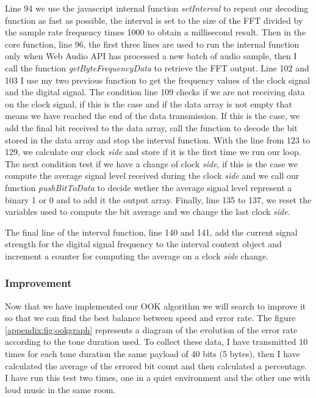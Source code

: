 \documentclass[twocolumn,14pt]{extarticle}
\begin{document}
Line 94 we use the javascript internal function \textit{setInterval} to repeat our decoding function as fast as possible, the interval is set to the size of the FFT divided by the sample rate frequency times 1000 to obtain a millisecond result. Then in the core function, line 96, the first three lines are used to run the internal function only when Web Audio API has processed a new batch of audio sample, then I call the function \textit{getByteFrequencyData} to retrieve the FFT output. Line 102 and 103 I use my two previous function to get the frequency values of the clock signal and the digital signal. The condition line 109 checks if we are not receiving data on the clock signal, if this is the case and if the data array is not empty that means we have reached the end of the data transmission. If this is the case, we add the final bit received to the data array, call the function to decode the bit stored in the data array and stop the interval function. With the line from 123 to 129, we calculate our clock \textit{side} and store if it is the first time we run our loop. The next condition test if we have a change of clock \textit{side}, if this is the case we compute the average signal level received during the clock \textit{side} and we call our function \textit{pushBitToData} to decide wether the average signal level represent a binary 1 or 0 and to add it the output array. Finally, line 135 to 137, we reset the variables used to compute the bit average and we change the last clock \textit{side}.

The final line of the interval function, line 140 and 141, add the current signal strength for the digital signal frequency to the interval context object and increment a counter for computing the average on a clock \textit{side} change.

\subsubsection{Improvement}
Now that we have implemented our OOK algorithm we will search to improve it so that we can find the best balance between speed and error rate. The figure \ref{appendix:fig:ookgraph} represents a diagram of the evolution of the error rate according to the tone duration used. To collect these data, I have transmitted 10 times for each tone duration the same payload of 40 bits (5 bytes), then I have calculated the average of the errored bit count and then calculated a percentage. I have run this test two times, one in a quiet environment and the other one with loud music in the same room. 
\end{document}
